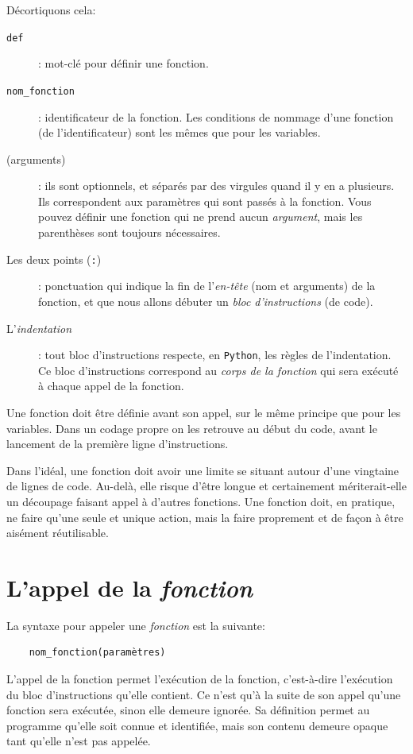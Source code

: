 \documentclass[a4paper,12pt]{book}
\begin{document}
Décortiquons cela:
\begin{description}
	\item[\texttt{def}]: mot-clé pour définir une fonction.
	\item[\texttt{nom\_fonction}]: identificateur de la fonction. Les conditions de nommage d'une fonction (de l'identificateur) sont les mêmes que pour les variables.
	\item[(arguments)]: ils sont optionnels, et séparés par des virgules quand il y en a plusieurs. Ils correspondent aux paramètres qui sont passés à la fonction. Vous pouvez définir une fonction qui ne prend aucun \textit{argument}, mais les parenthèses sont toujours nécessaires.
	\item[Les deux points (\texttt{:})]: ponctuation qui indique la fin de l'\textit{en-tête} (nom et arguments) de la fonction, et que nous allons débuter un \textit{bloc d'instructions} (de code).
	\item[L'\textit{indentation}]: tout bloc d'instructions respecte, en \texttt{Python}, les règles de l'indentation. Ce bloc d'instructions correspond au \textit{corps de la fonction} qui sera exécuté à chaque appel de la fonction.
\end{description}
\medskip

Une fonction doit être définie avant son appel, sur le même principe que pour les variables. Dans un codage \og propre\fg{} on les retrouve au début du code, avant le lancement de la première ligne d'instructions.
\medskip

Dans l'idéal, une fonction doit avoir une limite se situant autour d'une vingtaine de lignes de code. Au-delà, elle risque d'être longue et certainement mériterait-elle un découpage faisant appel à d'autres fonctions. Une fonction doit, en pratique, ne faire qu'une seule et unique action, mais la faire proprement et de façon à être aisément réutilisable.
\medskip

\section{L'appel de la \textit{fonction}}
La syntaxe pour appeler une \textit{fonction} est la suivante:
\begin{verbatim}
    nom_fonction(paramètres)
\end{verbatim}
\medskip

L'appel de la fonction permet l'exécution de la fonction, c'est-à-dire l'exécution du bloc d'instructions qu'elle contient. Ce n'est qu'à la suite de son appel qu'une fonction sera exécutée, sinon elle demeure ignorée. Sa définition permet au programme qu'elle soit connue et identifiée, mais son contenu demeure opaque tant qu'elle n'est pas appelée.
\medskip
\end{document}
